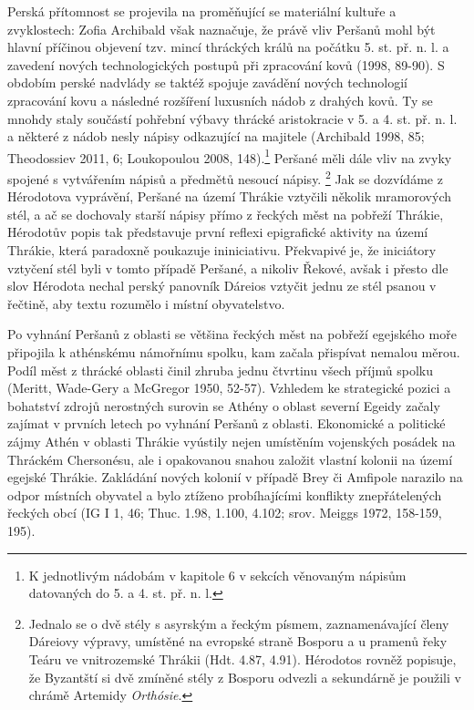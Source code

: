 Perská přítomnost se projevila na proměňující se materiální kultuře a zvyklostech: Zofia Archibald však naznačuje, že právě vliv Peršanů mohl být hlavní příčinou objevení tzv. mincí thráckých králů na počátku 5. st. př. n. l. a zavedení nových technologických postupů při zpracování kovů (1998, 89-90). S obdobím perské nadvlády se taktéž spojuje zavádění nových technologií zpracování kovu a následné rozšíření luxusních nádob z drahých kovů. Ty se mnohdy staly součástí pohřební výbavy thrácké aristokracie v 5. a 4. st. př. n. l. a některé z nádob nesly nápisy odkazující na majitele (Archibald 1998, 85; Theodossiev 2011, 6; Loukopoulou 2008, 148).\footnote{K jednotlivým nádobám v kapitole 6 v sekcích věnovaným nápisům datovaných do 5. a 4. st. př. n. l.} Peršané měli dále vliv na zvyky spojené s vytvářením nápisů a předmětů nesoucí nápisy. \footnote{Jednalo se o dvě stély s asyrským a řeckým písmem, zaznamenávající členy Dáreiovy výpravy, umístěné na evropské straně Bosporu a u pramenů řeky Teáru ve vnitrozemské Thrákii (Hdt. 4.87, 4.91). Hérodotos rovněž popisuje, že Byzantští si dvě zmíněné stély z Bosporu odvezli a sekundárně je použili v chrámě Artemidy {\em Orthósie}.} Jak se dozvídáme z Hérodotova vyprávění, Peršané na území Thrákie vztyčili několik mramorových stél, a ač se dochovaly starší nápisy přímo z řeckých měst na pobřeží Thrákie, Hérodotův popis tak představuje první reflexi epigrafické aktivity na území Thrákie, která paradoxně poukazuje ininiciativu. Překvapivé je, že iniciátory vztyčení stél byli v tomto případě Peršané, a nikoliv Řekové, avšak i přesto dle slov Hérodota nechal perský panovník Dáreios vztyčit jednu ze stél psanou v řečtině, aby textu rozumělo i místní obyvatelstvo.

Po vyhnání Peršanů z oblasti se většina řeckých měst na pobřeží egejského moře připojila k athénskému námořnímu spolku, kam začala přispívat nemalou měrou. Podíl měst z thrácké oblasti činil zhruba jednu čtvrtinu všech příjmů spolku (Meritt, Wade-Gery a McGregor 1950, 52-57). Vzhledem ke strategické pozici a bohatství zdrojů nerostných surovin se Athény o oblast severní Egeidy začaly zajímat v prvních letech po vyhnání Peršanů z oblasti. Ekonomické a politické zájmy Athén v oblasti Thrákie vyústily nejen umístěním vojenských posádek na Thráckém Chersonésu, ale i opakovanou snahou založit vlastní kolonii na území egejské Thrákie. Zakládání nových kolonií v případě Brey či Amfipole narazilo na odpor místních obyvatel a bylo ztíženo probíhajícími konflikty znepřátelených řeckých obcí (IG I 1, 46; Thuc. 1.98, 1.100, 4.102; srov. Meiggs 1972, 158-159, 195).

